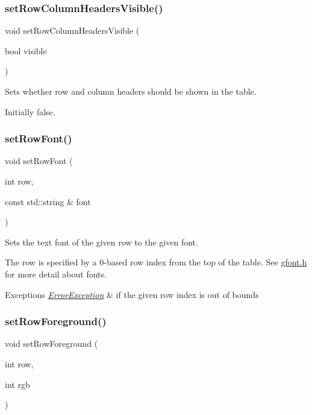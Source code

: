 \subsubsection{\texorpdfstring{set\+Row\+Column\+Headers\+Visible()}{setRowColumnHeadersVisible()}}
{\footnotesize\ttfamily void set\+Row\+Column\+Headers\+Visible (\begin{DoxyParamCaption}\item[{bool}]{visible }\end{DoxyParamCaption})\hspace{0.3cm}{\ttfamily [virtual]}}



Sets whether row and column headers should be shown in the table. 

Initially false. \mbox{\label{classGTable_adaeccb3f3fd318185b8adc644aaca949}} 
\subsubsection{\texorpdfstring{set\+Row\+Font()}{setRowFont()}}
{\footnotesize\ttfamily void set\+Row\+Font (\begin{DoxyParamCaption}\item[{int}]{row,  }\item[{const std\+::string \&}]{font }\end{DoxyParamCaption})\hspace{0.3cm}{\ttfamily [virtual]}}



Sets the text font of the given row to the given font. 

The row is specified by a 0-\/based row index from the top of the table. See \mbox{\hyperlink{gfont_8h_source}{gfont.\+h}} for more detail about fonts. 
\begin{DoxyExceptions}{Exceptions}
{\em \mbox{\hyperlink{classErrorException}{Error\+Exception}}} & if the given row index is out of bounds \\
\hline
\end{DoxyExceptions}
\mbox{\label{classGTable_abe6e1382d3d98a9479cf43ac204b0ee3}} 
\subsubsection{\texorpdfstring{set\+Row\+Foreground()}{setRowForeground()}\hspace{0.1cm}{\footnotesize\ttfamily [1/2]}}
{\footnotesize\ttfamily void set\+Row\+Foreground (\begin{DoxyParamCaption}\item[{int}]{row,  }\item[{int}]{rgb }\end{DoxyParamCaption})\hspace{0.3cm}{\ttfamily [virtual]}}




